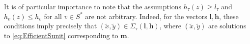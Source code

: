 It is of particular importance to note that the assumptions $h_{\tau}(z) \geq l_{\tau}$ and  $h_v(z)\leq h_v$ for all $v\in S^*$ are not arbitrary. Indeed, for the vectors $\mathbf{l}, \mathbf{h}$, these conditions imply precisely that $(\tilde{x},\tilde{y}) \in \Sigma_{\tau}(\mathbf{l}, \mathbf{h})$, where $(\tilde{x},\tilde{y})$ are solutions to \eqref{eq:EfficientSunit} corresponding to $\mathbf{m}$.


%

%

